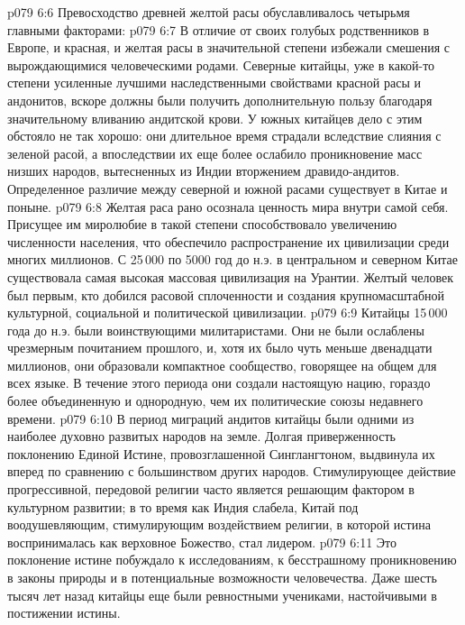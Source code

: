 \vs p079 6:6 Превосходство древней желтой расы обуславливалось четырьмя главными факторами:
\vs p079 6:7 \bibnobreakspace {} В отличие от своих голубых родственников в Европе, и красная, и желтая расы в значительной степени избежали смешения с вырождающимися человеческими родами. Северные китайцы, уже в какой\hyp{}то степени усиленные лучшими наследственными свойствами красной расы и андонитов, вскоре должны были получить дополнительную пользу благодаря значительному вливанию андитской крови. У южных китайцев дело с этим обстояло не так хорошо: они длительное время страдали вследствие слияния с зеленой расой, а впоследствии их еще более ослабило проникновение масс низших народов, вытесненных из Индии вторжением дравидо\hyp{}андитов. Определенное различие между северной и южной расами существует в Китае и поныне.
\vs p079 6:8 \bibnobreakspace {} Желтая раса рано осознала ценность мира внутри самой себя. Присущее им миролюбие в такой степени способствовало увеличению численности населения, что обеспечило распространение их цивилизации среди многих миллионов. С 25\,000 по 5000 год до н.э. в центральном и северном Китае существовала самая высокая массовая цивилизация на Урантии. Желтый человек был первым, кто добился расовой сплоченности и создания крупномасштабной культурной, социальной и политической цивилизации.
\vs p079 6:9 Китайцы 15\,000 года до н.э. были воинствующими милитаристами. Они не были ослаблены чрезмерным почитанием прошлого, и, хотя их было чуть меньше двенадцати миллионов, они образовали компактное сообщество, говорящее на общем для всех языке. В течение этого периода они создали настоящую нацию, гораздо более объединенную и однородную, чем их политические союзы недавнего времени.
\vs p079 6:10 \bibnobreakspace {} В период миграций андитов китайцы были одними из наиболее духовно развитых народов на земле. Долгая приверженность поклонению Единой Истине, провозглашенной Синглангтоном, выдвинула их вперед по сравнению с большинством других народов. Стимулирующее действие прогрессивной, передовой религии часто является решающим фактором в культурном развитии; в то время как Индия слабела, Китай под воодушевляющим, стимулирующим воздействием религии, в которой истина воспринималась как верховное Божество, стал лидером.
\vs p079 6:11 Это поклонение истине побуждало к исследованиям, к бесстрашному проникновению в законы природы и в потенциальные возможности человечества. Даже шесть тысяч лет назад китайцы еще были ревностными учениками, настойчивыми в постижении истины.
